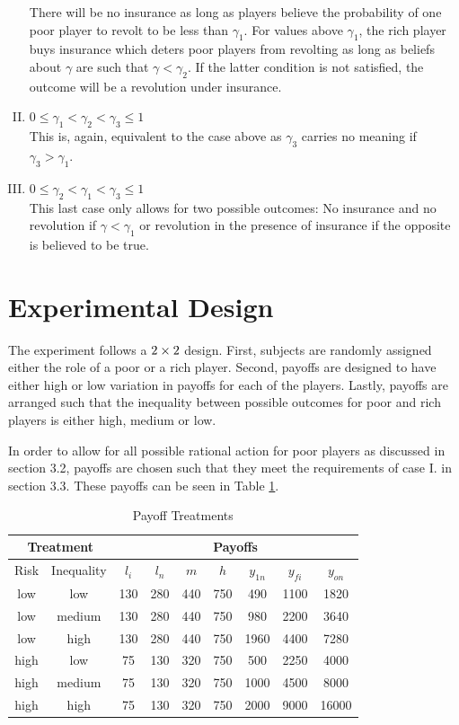 \documentclass[12pt]{article}
\begin{document}
\begin{enumerate}[I.]
				There will be no insurance as long as players believe the 
				probability of one poor player to revolt to be less than 
				$\gamma_1$. For values above $\gamma_1$, the rich player buys 
				insurance which deters poor players from revolting as long as 
				beliefs about $\gamma$ are such that $\gamma<\gamma_2$. If the 
				latter condition is not satisfied, the outcome will be a 
				revolution under insurance.
		\item	$0 \leq \gamma_1 < \gamma_2 < \gamma_3 \leq 1$\\
				This is, again, equivalent to the case above as $\gamma_3$ 
				carries no meaning if $\gamma_3 > \gamma_1$.
		\item	$0 \leq \gamma_2 < \gamma_1 < \gamma_3 \leq 1$\\
				This last case only allows for two possible outcomes: No 
				insurance and no revolution if $\gamma<\gamma_1$ or revolution 
				in the presence of insurance if the opposite is believed to be 
				true.
	\end{enumerate}
	
	\section{Experimental Design}
	The experiment follows a $2\times2\time3$ design. First, subjects are 
	randomly assigned either the role of a poor or a rich player. Second, 
	payoffs are designed to have either high or low variation in payoffs for 
	each of the players. Lastly, payoffs are arranged such that the inequality 
	between possible outcomes for poor and rich players is either high, medium 
	or low.
	
	In order to allow for all possible rational action for poor players as 
	discussed in section 3.2, payoffs are chosen such that they meet the 
	requirements of case I. in section 3.3. These payoffs can be seen in Table 
	\ref{allpayoffs}.
	
	\begin{table}[!htbp]
		\caption{Payoff Treatments}
		\label{allpayoffs}
		\centering
		\begin{tabular}{|c|c||c|c|c|c|c|c|c|}
			\multicolumn{2}{c}{Treatment} &\multicolumn{7}{c}{Payoffs}\\
			\hline
			Risk & Inequality & $l_i$ & $l_n$ & $m$ & $h$ & $y_{1n}$ & $y_{fi}$ 
			& $y_{on}$\\
			\hline
			low & low & 130 & 280 & 440 & 750 & 490 & 1100 & 1820\\
			low & medium & 130 & 280 & 440 & 750 & 980 & 2200 & 3640\\
			low & high & 130 & 280 & 440 & 750 & 1960 & 4400 & 7280\\
			high & low & 75 & 130 & 320 & 750 & 500 & 2250 & 4000\\
			high & medium & 75 & 130 & 320 & 750 & 1000 & 4500 & 8000\\
			high & high & 75 & 130 & 320 & 750 & 2000 & 9000 & 16000\\			
			\hline
		\end{tabular}
	\end{table}
	
\end{document}
